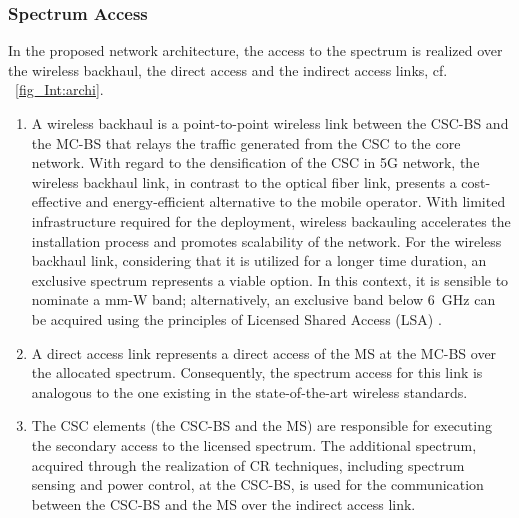 \subsubsection*{Spectrum Access}
In the proposed network architecture, the access to the spectrum is realized over the wireless backhaul, the direct access and the indirect access links, cf. \figurename~\ref{fig_Int:archi}.
\begin{enumerate}
\item A wireless backhaul is a
point-to-point wireless link between the CSC-BS and the MC-BS that relays the traffic generated from the CSC to the core network. With regard to the densification of the CSC in 5G network, the wireless backhaul link, in contrast to the optical fiber link, presents a cost-effective and energy-efficient alternative to the mobile operator.
With limited infrastructure required for the deployment, wireless backauling accelerates the installation process and promotes scalability of the network.
For the wireless backhaul link, considering that it is utilized for a longer time duration, an exclusive spectrum represents a viable option. In this context, it is sensible to nominate a mm-W band; alternatively, an exclusive band below \SI{6}{GHz} can be acquired using the principles of Licensed Shared Access (LSA) \cite{ETSI13}.

\item A direct access link represents a direct access of the MS at the MC-BS over the allocated spectrum. Consequently, the spectrum access for this link is analogous to the one existing in the state-of-the-art wireless standards.
\item The CSC elements (the CSC-BS and the MS) are responsible for executing the secondary access to the licensed spectrum. The additional spectrum, acquired through the realization of CR techniques, including spectrum sensing and power control, at the CSC-BS, is used for the communication between the CSC-BS and the MS over the indirect access link.
\end{enumerate}

